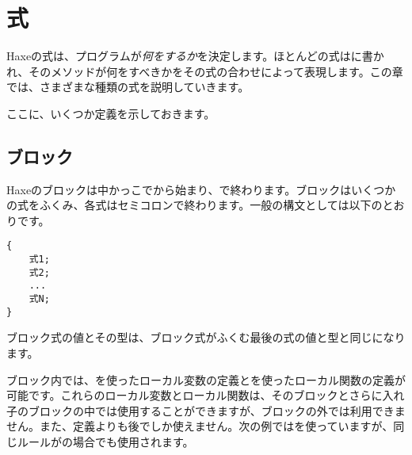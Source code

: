\chapter{式}
\label{expression}

Haxeの式は、プログラムが\emph{何をするか}を決定します。ほとんどの式はに書かれ、そのメソッドが何をすべきかをその式の合わせによって表現します。この章では、さまざまな種類の式を説明していきます。

ここに、いくつか定義を示しておきます。




\section{ブロック}
\label{expression-block}

Haxeのブロックは中かっこで\expr{\{}から始まり、\expr{\}}で終わります。ブロックはいくつかの式をふくみ、各式はセミコロンで終わります。一般の構文としては以下のとおりです。

\begin{lstlisting}
{
	式1;
	式2;
	...
	式N;
}
\end{lstlisting}

ブロック式の値とその型は、ブロック式がふくむ最後の式の値と型と同じになります。

ブロック内では、を使ったローカル変数の定義とを使ったローカル関数の定義が可能です。これらのローカル変数とローカル関数は、そのブロックとさらに入れ子のブロックの中では使用することができますが、ブロックの外では利用できません。また、定義よりも後でしか使えません。次の例ではを使っていますが、同じルールがの場合でも使用されます。

